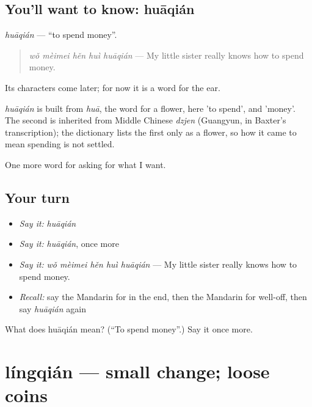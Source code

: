 \subsection*{You'll want to know: huāqián}
\emph{huāqián} — \textquotedblleft{}to spend money\textquotedblright{}.

\begin{quote}
\emph{wǒ mèimei hěn huì huāqián} — My little sister really knows how to spend money.
\end{quote}

Its characters come later; for now it is a word for the ear.

\begin{cousinweb}
\emph{huāqián} is built from \emph{huā}, the word for a flower, here 'to spend', and  'money'. The second is inherited from Middle Chinese \emph{dzjen} (Guangyun, in Baxter's transcription); the dictionary lists the first only as a flower, so how it came to mean spending is not settled.
\end{cousinweb}

\begin{grammarlens}[title={What you've built}]
One more word for asking for what I want.
\end{grammarlens}

\subsection*{Your turn}
\begin{itemize}
\raggedright
  \item \emph{Say it:} \emph{huāqián}
  \item \emph{Say it:} \emph{huāqián}, once more
  \item \emph{Say it:} \emph{wǒ mèimei hěn huì huāqián} — My little sister really knows how to spend money.
  \item \emph{Recall:} say the Mandarin for in the end, then the Mandarin for well-off, then say \emph{huāqián} again
\end{itemize}

\begin{tcolorbox}[breakable,colback=teal!4,colframe=teal!35!black,title={Before you move on}]
What does huāqián mean? (\textquotedblleft{}To spend money\textquotedblright{}.) Say it once more.
\end{tcolorbox}
\section[língqián]{língqián — small change; loose coins}

